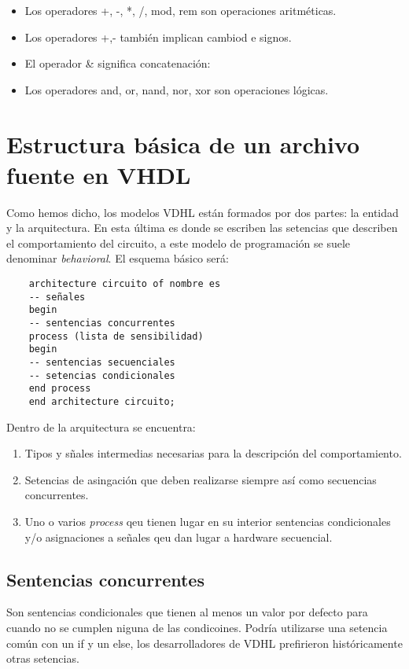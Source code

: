 \begin{itemize}
    \item Los operadores +, -, *, /, mod, rem son operaciones aritméticas.
    \item Los operadores +,- también implican cambiod e signos.
    \item El operador & significa concatenación:
    \item Los operadores and, or, nand, nor, xor son operaciones lógicas. 
\end{itemize}


\section{Estructura básica de un archivo fuente en VHDL}

Como hemos dicho, los modelos VDHL están formados por dos partes: la entidad y la arquitectura. En esta última es donde se escriben las setencias que describen el comportamiento del circuito, a este modelo de programación se suele denominar \textit{behavioral}. El esquema básico será: 

\begin{lstlisting}
    architecture circuito of nombre es 
    -- señales
    begin 
    -- sentencias concurrentes
    process (lista de sensibilidad)
    begin 
    -- sentencias secuenciales
    -- setencias condicionales
    end process
    end architecture circuito; 
\end{lstlisting}
Dentro de la arquitectura se encuentra: 
\begin{enumerate}
    \item Tipos y sñales intermedias necesarias para la descripción del comportamiento. 
    \item Setencias de asingación que deben realizarse siempre así como secuencias concurrentes.
    \item Uno o varios \textit{process} qeu tienen lugar en su interior sentencias condicionales y/o asignaciones a señales qeu dan lugar a hardware secuencial. 
\end{enumerate}

\subsection{Sentencias concurrentes}

Son sentencias condicionales que tienen al menos un valor por defecto para cuando no se cumplen niguna de las condicoines. Podría utilizarse una setencia común con un if y un else, los desarrolladores de VDHL prefirieron históricamente otras setencias.

